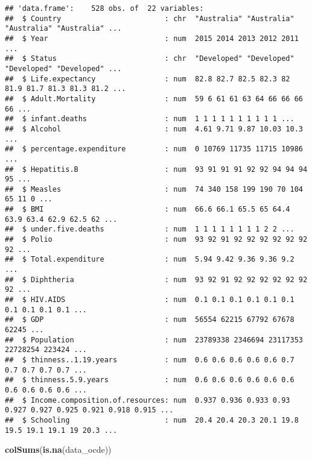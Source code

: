 \documentclass[
]{article}
\newenvironment{Shaded}{\begin{snugshade}}{\end{snugshade}}
\newcommand{\FunctionTok}[1]{\textcolor[rgb]{0.13,0.29,0.53}{\textbf{#1}}}
\newcommand{\NormalTok}[1]{#1}
\begin{document}
\begin{verbatim}
## 'data.frame':    528 obs. of  22 variables:
##  $ Country                        : chr  "Australia" "Australia" "Australia" "Australia" ...
##  $ Year                           : num  2015 2014 2013 2012 2011 ...
##  $ Status                         : chr  "Developed" "Developed" "Developed" "Developed" ...
##  $ Life.expectancy                : num  82.8 82.7 82.5 82.3 82 81.9 81.7 81.3 81.3 81.2 ...
##  $ Adult.Mortality                : num  59 6 61 61 63 64 66 66 66 66 ...
##  $ infant.deaths                  : num  1 1 1 1 1 1 1 1 1 1 ...
##  $ Alcohol                        : num  4.61 9.71 9.87 10.03 10.3 ...
##  $ percentage.expenditure         : num  0 10769 11735 11715 10986 ...
##  $ Hepatitis.B                    : num  93 91 91 91 92 92 94 94 94 95 ...
##  $ Measles                        : num  74 340 158 199 190 70 104 65 11 0 ...
##  $ BMI                            : num  66.6 66.1 65.5 65 64.4 63.9 63.4 62.9 62.5 62 ...
##  $ under.five.deaths              : num  1 1 1 1 1 1 1 1 2 2 ...
##  $ Polio                          : num  93 92 91 92 92 92 92 92 92 92 ...
##  $ Total.expenditure              : num  5.94 9.42 9.36 9.36 9.2 ...
##  $ Diphtheria                     : num  93 92 91 92 92 92 92 92 92 92 ...
##  $ HIV.AIDS                       : num  0.1 0.1 0.1 0.1 0.1 0.1 0.1 0.1 0.1 0.1 ...
##  $ GDP                            : num  56554 62215 67792 67678 62245 ...
##  $ Population                     : num  23789338 2346694 23117353 22728254 223424 ...
##  $ thinness..1.19.years           : num  0.6 0.6 0.6 0.6 0.6 0.7 0.7 0.7 0.7 0.7 ...
##  $ thinness.5.9.years             : num  0.6 0.6 0.6 0.6 0.6 0.6 0.6 0.6 0.6 0.6 ...
##  $ Income.composition.of.resources: num  0.937 0.936 0.933 0.93 0.927 0.927 0.925 0.921 0.918 0.915 ...
##  $ Schooling                      : num  20.4 20.4 20.3 20.1 19.8 19.5 19.1 19.1 19 20.3 ...
\end{verbatim}

\begin{Shaded}
\begin{Highlighting}[]
\FunctionTok{colSums}\NormalTok{(}\FunctionTok{is.na}\NormalTok{(data\_ocde))}
\end{Highlighting}
\end{Shaded}
\end{document}
